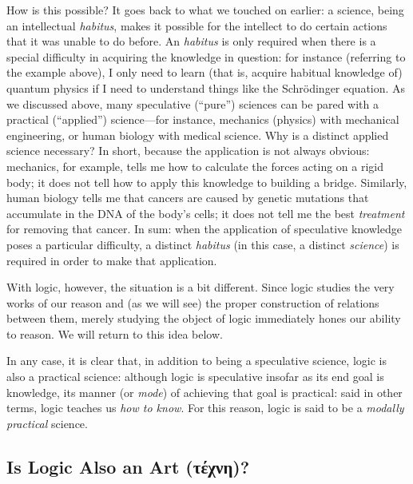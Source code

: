 \documentclass[article,12pt,a4paper,oneside]{memoir}
\begin{document}
    How is this possible? It goes back to what we touched on earlier: a
    science, being an intellectual \emph{habitus}, makes it possible for
    the intellect to do certain actions that it was unable to do before.
    An \emph{habitus} is only required when there is a special
    difficulty in acquiring the knowledge in question: for instance
    (referring to the example above), I only need to learn (that is,
    acquire habitual knowledge of) quantum physics if I need to
    understand things like the Schrödinger equation. As we discussed
    above, many speculative (``pure'') sciences can be pared with a
    practical (``applied'') science---for instance, mechanics (physics)
    with mechanical engineering, or human biology with medical science.
    Why is a distinct applied science necessary? In short, because the
    application is not always obvious: mechanics, for example, tells me
    how to calculate the forces acting on a rigid body; it does not tell
    how to apply this knowledge to building a bridge. Similarly, human
    biology tells me that cancers are caused by genetic mutations that
    accumulate in the DNA of the body's cells; it does not tell me the
    best \emph{treatment} for removing that cancer. In sum: when the
    application of speculative knowledge poses a particular difficulty,
    a distinct \emph{habitus} (in this case, a distinct \emph{science})
    is required in order to make that application.

    With logic, however, the situation is a bit different. Since logic
    studies the very works of our reason and (as we will see) the proper
    construction of relations between them, merely studying the object
    of logic immediately hones our ability to reason. We will return to
    this idea below.

    In any case, it is clear that, in addition to being a speculative
    science, logic is also a practical science: although logic is
    speculative insofar as its end goal is knowledge, its manner (or
    \emph{mode}) of achieving that goal is practical: said in other
    terms, logic teaches us \emph{how to know}. For this reason, logic
    is said to be a \emph{modally practical} science.

    \hypertarget{is-logic-also-an-art-ux3c4ux3adux3c7ux3bdux3b7}{%
    \subsection{Is Logic Also an Art
    (τέχνη)?}\label{is-logic-also-an-art-ux3c4ux3adux3c7ux3bdux3b7}}
\end{document}
